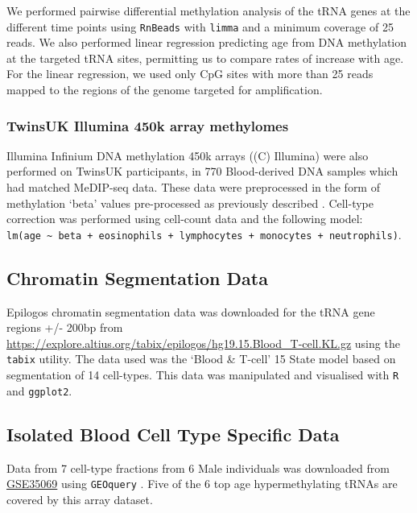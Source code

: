 \documentclass[
]{book}
\begin{document}
We performed pairwise differential methylation analysis of the tRNA genes at the different time points using \texttt{RnBeads} \citep{Muller2019} with \texttt{limma} \citep{Ritchie2015} and a minimum coverage of 25 reads.
We also performed linear regression predicting age from DNA methylation at the targeted tRNA sites, permitting us to compare rates of increase with age.
For the linear regression, we used only CpG sites with more than 25 reads mapped to the regions of the genome targeted for amplification.

\hypertarget{twinsuk-illumina-450k-array-methylomes}{%
\subsubsection{TwinsUK Illumina 450k array methylomes}\label{twinsuk-illumina-450k-array-methylomes}}

Illumina Infinium DNA methylation 450k arrays ((C) Illumina) were also performed on TwinsUK participants, in 770 Blood-derived DNA samples which had matched MeDIP-seq data.
These data were preprocessed in the form of methylation `beta' values pre-processed as previously described \citep{Bell2016, Bell2017a}.
Cell-type correction was performed using cell-count data and the following model: \texttt{lm(age\ \textasciitilde{}\ beta\ +\ eosinophils\ +\ lymphocytes\ +\ monocytes\ +\ neutrophils)}.

\hypertarget{chromatin-segmentation-data}{%
\subsection{Chromatin Segmentation Data}\label{chromatin-segmentation-data}}

Epilogos chromatin segmentation data \citep{Meuleman2019} was downloaded for the tRNA gene regions +/- 200bp from \url{https://explore.altius.org/tabix/epilogos/hg19.15.Blood_T-cell.KL.gz} using the \texttt{tabix} utility.
The data used was the `Blood \& T-cell' 15 State model based on segmentation of 14 cell-types.
This data was manipulated and visualised with \texttt{R} and \texttt{ggplot2}.

\hypertarget{sortedbloodmethods}{%
\subsection{Isolated Blood Cell Type Specific Data}\label{sortedbloodmethods}}

Data from 7 cell-type fractions from 6 Male individuals was downloaded from \href{https://www.ncbi.nlm.nih.gov/geo/query/acc.cgi?acc=GSE35069}{GSE35069} \citep{Reinius2012} using \texttt{GEOquery} \citep{Davis2007p}.
Five of the 6 top age hypermethylating tRNAs are covered by this array dataset.
\end{document}
